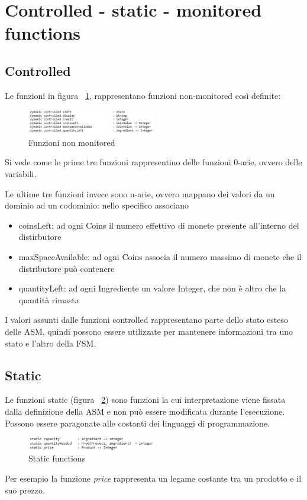 \section{Controlled - static - monitored functions}
\subsection{Controlled}
Le funzioni in figura ~\ref{fig:notMonitored}, rappresentano funzioni non-monitored così definite:
\begin{figure}[h]
	\centering
	\includegraphics[width=0.5\textwidth]{Immagini/DynamicController.png}
	\caption{Funzioni non monitored}
	\label{fig:notMonitored}
\end{figure}

Si vede come le prime tre funzioni rappresentino delle funzioni 0-arie, ovvero delle variabili.

Le ultime tre funzioni invece sono n-arie, ovvero mappano dei valori da un dominio ad un codominio: nello specifico associano
\begin{itemize}
	\item coinsLeft: ad ogni Coins il numero effettivo di monete presente all'interno del distirbutore
	\item maxSpaceAvailable: ad ogni Coins associa il numero massimo di monete che il distributore può contenere
	\item quantityLeft: ad ogni Ingrediente un valore Integer, che non è altro che la quantità rimasta
\end{itemize}

I valori assunti dalle funzioni controlled rappresentano parte dello stato esteso delle ASM, quindi possono essere utilizzate per mantenere informazioni tra uno stato e l’altro della FSM.

\subsection{Static}
Le funzioni static (figura ~\ref{fig:staticFunc}) sono funzioni la cui interpretazione viene fissata dalla definizione della ASM e non può essere modificata durante l’esecuzione.
Possono essere paragonate alle costanti dei linguaggi di programmazione.
\begin{figure}[h]
	\centering
	\includegraphics[width=0.5\textwidth]{Immagini/StaticFunction.png}
	\caption{Static functions}
	\label{fig:staticFunc}
\end{figure}
Per esempio la funzione \textit{price} rappresenta un legame costante tra un prodotto e il suo prezzo. 

